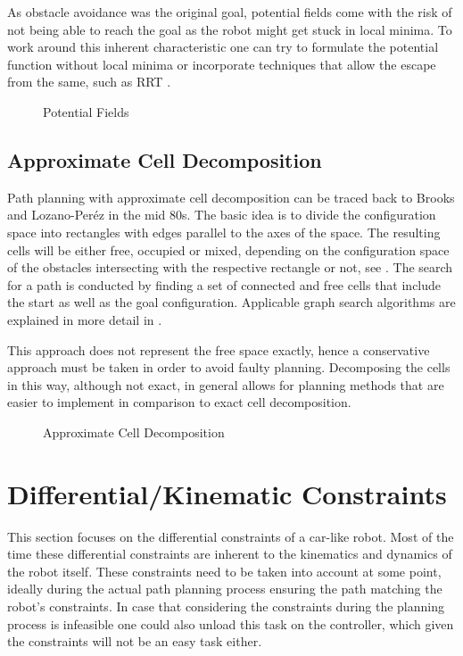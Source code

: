 As obstacle avoidance was the original goal, potential fields come with the risk of not being able to reach the goal as the robot might get stuck in local minima. To work around this inherent characteristic one can try to formulate the potential function without local minima or incorporate techniques that allow the escape from the same, such as RRT \cite{LaValle.2006}. \cite{Latombe.1991}

\begin{figure}[h]
    \caption{Potential Fields}
    \label{fig:potentialFields}
\end{figure}

\subsection{Approximate Cell Decomposition}
Path planning with approximate cell decomposition can be traced back to Brooks and Lozano-Peréz in the mid 80s. The basic idea is to divide the configuration space into rectangles with edges parallel to the axes of the space. The resulting cells will be either free, occupied or mixed, depending on the configuration space of the obstacles intersecting with the respective rectangle or not, see . The search for a path is conducted by finding a set of connected and free cells that include the start as well as the goal configuration.\cite{Brooks.1985} Applicable graph search algorithms are explained in more detail in .

This approach does not represent the free space exactly, hence a conservative approach must be taken in order to avoid faulty planning. Decomposing the cells in this way, although not exact, in general allows for planning methods that are easier to implement in comparison to exact cell decomposition. \cite{Latombe.1991}

\begin{figure}[h]
    \caption{Approximate Cell Decomposition}
    \label{fig:cellDecomposition}
\end{figure}

\section{Differential/Kinematic Constraints}
This section focuses on the differential constraints of a car-like robot. Most of the time these differential constraints are inherent to the kinematics and dynamics of the robot itself. These constraints need to be taken into account at some point, ideally during the actual path planning process ensuring the path matching the robot's constraints. In case that considering the constraints during the planning process is infeasible one could also unload this task on the controller, which given the constraints will not be an easy task either. \cite{LaValle.2006}

